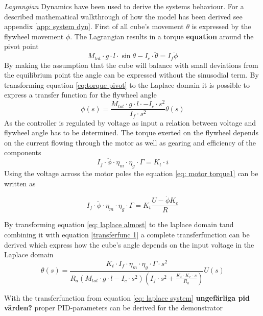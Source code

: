 \documentclass[a4paper,11pt]{kth-mag}
\begin{document}
\emph{Lagrangian} Dynamics have been used to derive the systems behaviour. For a described mathematical walkthrough of how the model has been derived see appendix \ref{app: system dyn}. First of all cube's movement $\theta$ is expressed by the flywheel movement $\phi$. The Lagrangian  results in a torque \textbf{equation} around the pivot point
\begin{equation} \label{eq:torque pivot}
M_{tot} \cdot g \cdot l \cdot \sin \theta - I_c \cdot \ddot{\theta} = I_f \ddot{\phi}
\end{equation}
By making the assumption that the cube will balance with small deviations from the equilibrium point the angle can be expressed without the sinusodial term. By transforming equation \ref{eq:torque pivot} to the Laplace domain it is possible to express a transfer function for the flywheel angle
\begin{equation} \label{transferfunc 1}
\phi (s) = \frac{M_{tot} \cdot g \cdot l \cdot-I_c \cdot s^2}{I_f \cdot s^2}  \theta(s)
\end{equation}
As the controller is regulated by voltage as input a relation between voltage and flywheel angle has to be determined. The torque exerted on the flywheel depends on the current flowing through the motor as well as gearing and efficiency of the components
\begin{equation} \label{eq: motor torque1}
I_f \cdot \ddot{\phi} \cdot \eta_m \cdot \eta_g \cdot \Gamma = K_t \cdot i
\end{equation}
Using the voltage across the motor poles the equation \ref{eq: motor torque1} can be written as

\begin{equation} \label{eq: laplace almost}
I_f \cdot \ddot{\phi} \cdot \eta_m \cdot \eta_g \cdot \Gamma = K_t \frac{U - \dot{\phi} K_e}{R}
\end{equation} 

By transforming equation \ref{eq: laplace almost} to the laplace domain tand combining it with equation \ref{transferfunc 1} a complete transferfunction can be derived which express how the cube's angle depends on the input voltage in the Laplace domain
\begin{equation} \label{eq: laplace system}
\theta(s) = \frac{K_t \cdot I_f \cdot \eta_m \cdot \eta_g \cdot \Gamma \cdot s^2}{R_a (M_{tot} \cdot g \cdot l - I_c \cdot s^2)(I_f \cdot s^2 + \frac{K_t \cdot K_e \cdot s}{R_a})} U(s)
\end{equation}

With the transferfunction from equation \ref{eq: laplace system} \textbf{ungefärliga pid värden?} proper PID-parameters can be derived for the demonstrator
 
\end{document}
